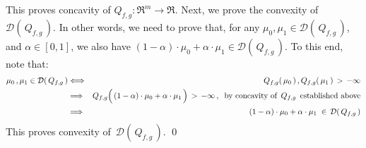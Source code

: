 This proves concavity of $Q_{f,g} : \Re^{m} \longrightarrow \Re$.
\vskip 0.2cm
\noindent
Next, we prove the convexity of $\mathcal{D}(\,Q_{f,g}\,)$.
In other words, we need to prove that,
for any $\mu_{0}, \mu_{1} \in \mathcal{D}(\,Q_{f,g}\,)$, and $\alpha\in[0,1]$,
we also have $(1-\alpha)\cdot\mu_{0}+\alpha\cdot\mu_{1}\in\mathcal{D}(\,Q_{f,g}\,)$.
To this end, note that:
\begin{eqnarray*}
\mu_{0}\,, \mu_{1} \in \mathcal{D}(\,Q_{f,g}\,)
& \Longleftrightarrow &
	Q_{f,g}(\,\mu_{0}\,)\,, Q_{f,g}(\,\mu_{1}\,) \, > \, -\infty 
\\
& \Longrightarrow &
	Q_{f,g}\!\left(\,(1-\alpha)\cdot\mu_{0}\overset{{\color{white}.}}{+}\alpha\cdot\mu_{1}\,\right)
	\, > \, -\infty\,,\;\;
	\textnormal{by concavity of \,$Q_{f,g}$\, established above}
\\
& \Longrightarrow &
	(1-\alpha)\cdot\mu_{0}\overset{{\color{white}.}}{+}\alpha\cdot\mu_{1}
	\;\in\, \mathcal{D}(\,Q_{f,g}\,)
\end{eqnarray*}
This proves convexity of \,$\mathcal{D}(\,Q_{f,g}\,)$.
\qed


\renewcommand{\theenumi}{\roman{enumi}}
\renewcommand{\labelenumi}{\textnormal{(\theenumi)}$\;\;$}

